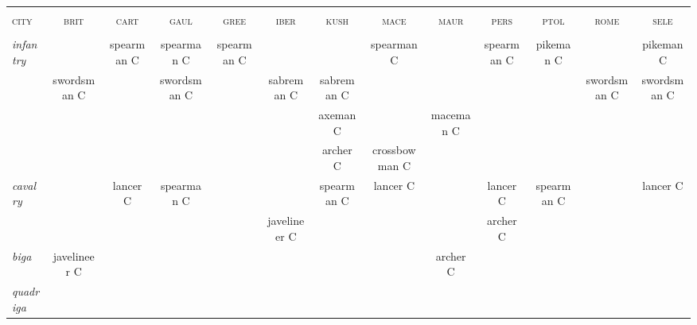 \documentclass{article}
\newcommand{\brit}{\textsc{\color{blue} brit}}
\newcommand{\cart}{\textsc{\color{blue} cart}}
\newcommand{\gaul}{\textsc{\color{blue} gaul}}
\newcommand{\gree}{\textsc{\color{blue} gree}}
\newcommand{\iber}{\textsc{\color{blue} iber}}
\newcommand{\kush}{\textsc{\color{blue} kush}}
\newcommand{\mace}{\textsc{\color{blue} mace}}
\newcommand{\maur}{\textsc{\color{blue} maur}}
\newcommand{\pers}{\textsc{\color{blue} pers}}
\newcommand{\ptol}{\textsc{\color{blue} ptol}}
\newcommand{\rome}{\textsc{\color{blue} rome}}
\newcommand{\sele}{\textsc{\color{blue} sele}}
\newcommand{\city}{\textsc{\color{blue} city}}
\begin{document}
\begin{landscape}
\begin{tabular}{l||c|c|c|c||c|c|c|c||c|c|c|c}
\hline
\hline
 &                &                &                &                &                &                &                &                &                &                &                &                \\
\city %
 & \brit          & \cart          & \gaul          & \gree          & \iber          & \kush          & \mace          & \maur          & \pers          & \ptol          & \rome          & \sele          \\
 &                &                &                &                &                &                &                &                &                &                &                &                \\
\hline
\hline\textit{infantry}
 &                & spearman C     & spearman C     & spearman C     &                &                & spearman C     &                & spearman C     & pikeman C      &                & pikeman C      \\
 & swordsman C    &                & swordsman C    &                & sabreman C     & sabreman C     &                &                &                &                & swordsman C    & swordsman C    \\
 &                &                &                &                &                & axeman C       &                & maceman C      &                &                &                &                \\
 &                &                &                &                &                & archer C       & crossbowman C  &                &                &                &                &                \\
\hline\textit{cavalry}
 &                & lancer C       & spearman C     &                &                & spearman C     & lancer C       &                & lancer C       & spearman C     &                & lancer C       \\
 &                &                &                &                & javelineer C   &                &                &                & archer C       &                &                &                \\
\hline\textit{biga}
 & javelineer C   &                &                &                &                &                &                & archer C       &                &                &                &                \\
\hline\textit{quadriga}

\end{tabular}
\end{landscape}
\end{document}
